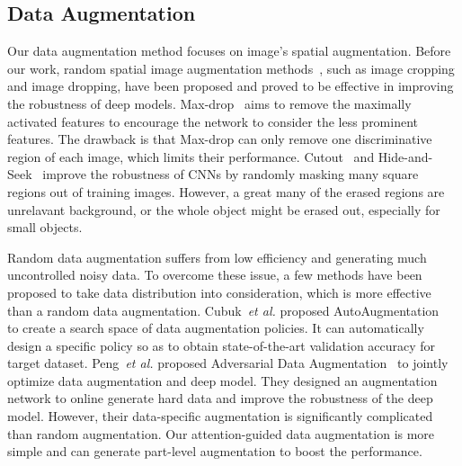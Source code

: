 \documentclass[10pt,twocolumn,letterpaper]{article}
\def\etal{{\em et al. }}
\begin{document}
\subsection{Data Augmentation}
Our data augmentation method focuses on image's spatial augmentation. Before our work, random spatial image augmentation methods~\cite{max-drop, cutout, hide-and-seek}, such as image cropping and image dropping, have been proposed and proved to be effective in improving the robustness of deep models. Max-drop~\cite{max-drop} aims to remove the maximally activated features to encourage the network to consider the less prominent features. The drawback is that Max-drop can only remove one discriminative region of each image, which limits their performance. Cutout~\cite{cutout} and Hide-and-Seek~\cite{hide-and-seek} improve the robustness of CNNs by randomly masking many square regions out of training images. However, a great many of the erased regions are unrelavant background, or the whole object might be erased out, especially for small objects.


Random data augmentation suffers from low efficiency and generating much uncontrolled noisy data. To overcome these issue, a few methods have been proposed to take data distribution into consideration, which is more effective than a random data augmentation. Cubuk~\etal proposed AutoAugmentation~\cite{auto_autment} to create a search space of data augmentation policies. It can automatically design a specific policy so as to obtain state-of-the-art validation accuracy for target dataset. Peng~\etal proposed Adversarial Data Augmentation~\cite{ada} to jointly optimize data augmentation and deep model. They designed an augmentation network to online generate hard data and improve the robustness of the deep model. However, their data-specific augmentation is significantly complicated than random augmentation. Our attention-guided data augmentation is more simple and can generate part-level augmentation to boost the performance.
\end{document}
